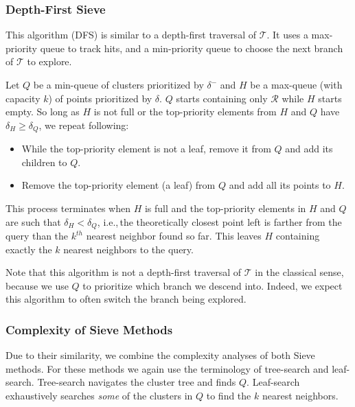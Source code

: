 \subsubsection{Depth-First Sieve}
\label{sec:methods:knn-search:depth-first-sieve}

This algorithm (DFS) is similar to a depth-first traversal of $\mathcal{T}$.
It uses a max-priority queue to track hits, and a min-priority queue to choose the next branch of $\mathcal{T}$ to explore.

Let $Q$ be a min-queue of clusters prioritized by $\delta^{-}$ and $H$ be a max-queue (with capacity $k$) of points prioritized by $\delta$.
$Q$ starts containing only $\mathcal{R}$ while $H$ starts empty.
So long as $H$ is not full or the top-priority elements from $H$ and $Q$ have $\delta_H \geq \delta_Q$, we repeat following:
\begin{itemize}
    \item While the top-priority element is not a leaf, remove it from $Q$ and add its children to $Q$.
    \item Remove the top-priority element (a leaf) from $Q$ and add all its points to $H$.
\end{itemize}
This process terminates when $H$ is full and the top-priority elements in $H$ and $Q$ are such that $\delta_H < \delta_Q$, i.e.,\,the theoretically closest point left is farther from the query than the $k^{th}$ nearest neighbor found so far.
This leaves $H$ containing exactly the $k$ nearest neighbors to the query.

Note that this algorithm is not a depth-first traversal of $\mathcal{T}$ in the classical sense, because we use $Q$ to prioritize which branch we descend into.
Indeed, we expect this algorithm to often switch the branch being explored.


\subsubsection{Complexity of Sieve Methods}
\label{sec:methods:knn-search:complexity-of-sieve-methods}

Due to their similarity, we combine the complexity analyses of both Sieve methods.
For these methods we again use the terminology of tree-search and leaf-search.
Tree-search navigates the cluster tree and finds $Q$.
Leaf-search exhaustively searches \textit{some} of the clusters in $Q$ to find the $k$ nearest neighbors.

